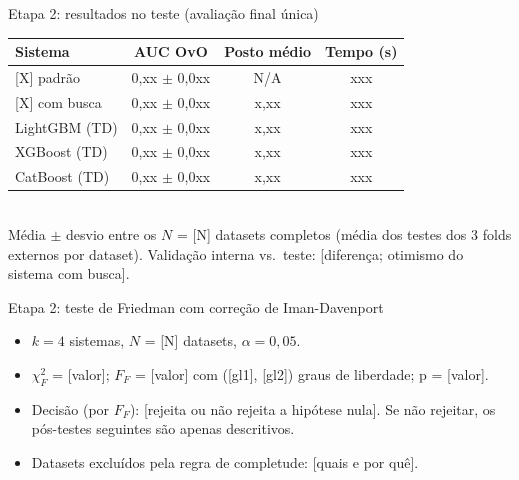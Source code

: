 \documentclass[aspectratio=169,11pt]{beamer}
\begin{document}
\begin{frame}{Etapa 2: resultados no teste (avaliação final única)}
    \footnotesize
    \begin{tabular}{l c c c}
        \toprule
        \textbf{Sistema} & \textbf{AUC OvO} & \textbf{Posto médio} & \textbf{Tempo (s)} \\
        \midrule
        {}[X] padrão  & 0,xx $\pm$ 0,0xx & N/A  & xxx \\
        {}[X] com busca & 0,xx $\pm$ 0,0xx & x,xx & xxx \\
        LightGBM (TD) & 0,xx $\pm$ 0,0xx & x,xx & xxx \\
        XGBoost (TD)  & 0,xx $\pm$ 0,0xx & x,xx & xxx \\
        CatBoost (TD) & 0,xx $\pm$ 0,0xx & x,xx & xxx \\
        \bottomrule
    \end{tabular}
    \\[0.3em]
    \footnotesize Média $\pm$ desvio entre os $N$ = [N] datasets completos (média dos testes dos 3 folds externos por dataset). Validação interna vs.\ teste: [diferença; otimismo do sistema com busca].
\end{frame}

\begin{frame}{Etapa 2: teste de Friedman com correção de Iman-Davenport}
    \begin{itemize}
        \item $k = 4$ sistemas, $N$ = [N] datasets, $\alpha = 0{,}05$.
        \item $\chi^2_F$ = [valor]; $F_F$ = [valor] com ([gl1], [gl2]) graus de liberdade; p = [valor].
        \item Decisão (por $F_F$): [rejeita ou não rejeita a hipótese nula]. Se não rejeitar, os pós-testes seguintes são apenas descritivos.
        \item Datasets excluídos pela regra de completude: [quais e por quê].
    \end{itemize}
\end{frame}
\end{document}
